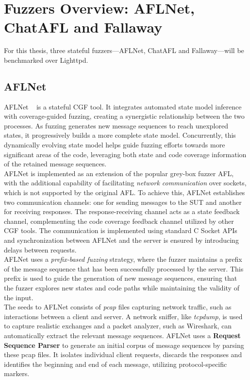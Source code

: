 \section{Fuzzers Overview: AFLNet, ChatAFL and Fallaway}

For this thesis, three stateful fuzzers—AFLNet, ChatAFL and Fallaway—will be benchmarked over Lighttpd.
 
\subsection{AFLNet}
AFLNet ~\cite{AFLNet} is a stateful CGF tool. It integrates automated state model inference with coverage-guided fuzzing, creating a synergistic relationship between the two processes. As fuzzing generates new message sequences to reach unexplored states, it progressively builds a more complete state model. Concurrently, this dynamically evolving state model helps guide fuzzing efforts towards more significant areas of the code, leveraging both state and code coverage information of the retained message sequences.
\\AFLNet is implemented as an extension of the popular grey-box fuzzer AFL, with the additional capability of facilitating \textit{network communication} over sockets, which is not supported by the original AFL. To achieve this, AFLNet establishes two communication channels: one for sending messages to the SUT and another for receiving responses. The response-receiving channel acts as a state feedback channel, complementing the code coverage feedback channel utilized by other CGF tools. The communication is implemented using standard C Socket APIs and synchronization between AFLNet and the server is ensured by introducing delays between requests.
\\AFLNet uses a \textit{prefix-based fuzzing} strategy, where the fuzzer maintains a prefix of the message sequence that has been successfully processed by the server. This prefix is used to guide the generation of new message sequences, ensuring that the fuzzer explores new states and code paths while maintaining the validity of the input.
\\The seeds to AFLNet consists of \textit{pcap} files capturing network traffic, such as interactions between a client and server. A network sniffer, like \textit{tcpdump}, is used to capture realistic exchanges and a packet analyzer, such as Wireshark, can automatically extract the relevant message sequences. AFLNet uses a \textbf{Request Sequence Parser} to generate an initial corpus of message sequences by parsing these pcap files. It isolates individual client requests, discards the responses and identifies the beginning and end of each message, utilizing protocol-specific markers.
